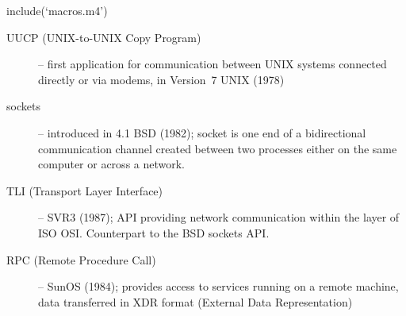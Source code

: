 
include(`macros.m4')

\pagebreak
{}

\begin{slide}
\end{slide}



\begin{slide}
\begin{description}
\item[UUCP (UNIX-to-UNIX Copy Program)] -- first application for communication
between UNIX systems connected directly or via modems, in Version~7 UNIX (1978)
\item[sockets] -- introduced in 4.1 BSD (1982); socket is one end of a
bidirectional communication channel created between two processes either on the
same computer or across a network.
\item[TLI (Transport Layer Interface)] -- SVR3 (1987); API providing network
communication within the  layer of ISO OSI.  Counterpart to the BSD
sockets API.
\item[RPC (Remote Procedure Call)] -- SunOS (1984); provides access to services
running on a remote machine, data transferred in XDR format (External Data
Representation)
\end{description}
\end{slide}

